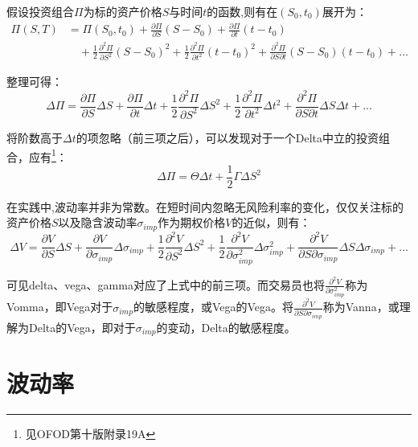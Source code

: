 \documentclass[11pt]{article}
\begin{document}
假设投资组合$\Pi$为标的资产价格$S$与时间$t$的函数,则有在$(S_0,t_0)$展开为：
\begin{align*}
    \Pi(S,T) &= \Pi(S_0,t_0) + \frac{\partial \Pi}{\partial S}(S-S_0) + \frac{\partial \Pi}{\partial t}(t-t_0) \\
    &\quad + \frac{1}{2}\frac{\partial^2 \Pi}{\partial S^2}(S-S_0)^2 + \frac{1}{2}\frac{\partial^2 \Pi}{\partial t^2}(t-t_0)^2 + \frac{\partial^2 \Pi}{\partial S \partial t}(S-S_0)(t-t_0) + \dots
\end{align*}

整理可得：
\begin{equation*}
    \Delta \Pi = \frac{\partial \Pi}{\partial S}\Delta S + \frac{\partial \Pi}{\partial t}\Delta t + \frac{1}{2}\frac{\partial^2 \Pi}{\partial S^2}\Delta S^2 + \frac{1}{2}\frac{\partial^2 \Pi}{\partial t^2}\Delta t^2 + \frac{\partial^2 \Pi}{\partial S \partial t}\Delta S \Delta t + \dots
\end{equation*}

将阶数高于$\Delta t$的项忽略（前三项之后），可以发现对于一个Delta中立的投资组合，应有\footnote{见OFOD第十版附录19A\label{ofod_19a}}：
\begin{equation*}
    \Delta \Pi = \Theta \Delta t + \frac{1}{2} \Gamma \Delta S^2
\end{equation*}

在实践中,波动率并非为常数。在短时间内忽略无风险利率的变化，仅仅关注标的资产价格$S$以及隐含波动率$\sigma_{imp}$作为期权价格$V$的近似，则有：
\begin{equation*}
    \Delta V = \frac{\partial V}{\partial S}\Delta S + \frac{\partial V}{\partial \sigma_{imp}}\Delta \sigma_{imp} + \frac{1}{2} \frac{\partial^2 V}{\partial S^2}\Delta S^2 + \frac{1}{2} \frac{\partial^2 V}{\partial \sigma^2_{imp}} \Delta \sigma^2_{imp} + \frac{\partial^2 V}{\partial S \partial \sigma_{imp}}\Delta S \Delta \sigma_{imp} + \dots
\end{equation*}

可见delta、vega、gamma对应了上式中的前三项。而交易员也将$\tfrac{\partial^2 V}{\partial \sigma^2_{imp}}$称为Vomma，即Vega对于$\sigma_{imp}$的敏感程度，或Vega的Vega。将$\tfrac{\partial^2 V}{\partial S\partial \sigma_{imp}}$称为Vanna，或理解为Delta的Vega，即对于$\sigma_{imp}$的变动，Delta的敏感程度。

\section{波动率}
\end{document}
